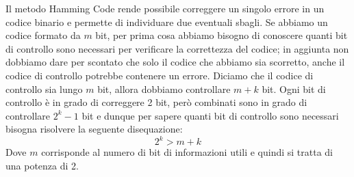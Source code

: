 \documentclass{article}
\begin{document}
Il metodo Hamming Code rende possibile correggere un singolo errore in un codice binario e permette di individuare due eventuali sbagli. Se abbiamo un codice formato da $m$ bit, per prima cosa abbiamo bisogno di conoscere quanti bit di controllo sono necessari per verificare la correttezza del codice; in aggiunta non dobbiamo dare per scontato che solo il codice che abbiamo sia scorretto, anche il codice di controllo potrebbe contenere un errore. Diciamo che il codice di controllo sia lungo $m$ bit, allora dobbiamo controllare $m + k$ bit. Ogni bit di controllo è in grado di correggere 2 bit, però combinati sono in grado di controllare $2^k-1$ bit e dunque per sapere quanti bit di controllo sono necessari bisogna risolvere la seguente disequazione:
\begin{equation}
	2^k>m+k
\end{equation}
Dove $m$ corrisponde al numero di bit di informazioni utili e quindi si tratta di una potenza di 2.\\
\end{document}
